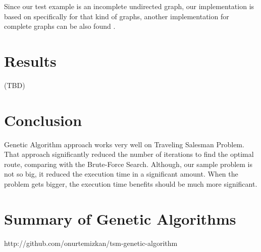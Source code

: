 \documentclass[journal,transmag]{IEEEtran}
\begin{document}
    Since our test example is an incomplete undirected graph, our implementation
    is based on specifically for that kind of graphs, another implementation for
    complete graphs can be also found \cite{code_repository}.

    \section{Results}
    (TBD)

    \section{Conclusion}
    Genetic Algorithm approach works very well on Traveling Salesman Problem.
    That approach significantly reduced the number of iterations to find the
    optimal route, comparing with the Brute-Force Search. Although, our sample
    problem is not so big, it reduced the execution time in a significant
    amount. When the problem gets bigger, the execution time benefits should be
    much more significant.

    \appendices
    \section{Summary of Genetic Algorithms}

    \ifCLASSOPTIONcaptionsoff
      \newpage
    \fi

    \begin{thebibliography}{1}

    http://github.com/onurtemizkan/tsm-genetic-algorithm
    \end{thebibliography}

    
\end{document}
